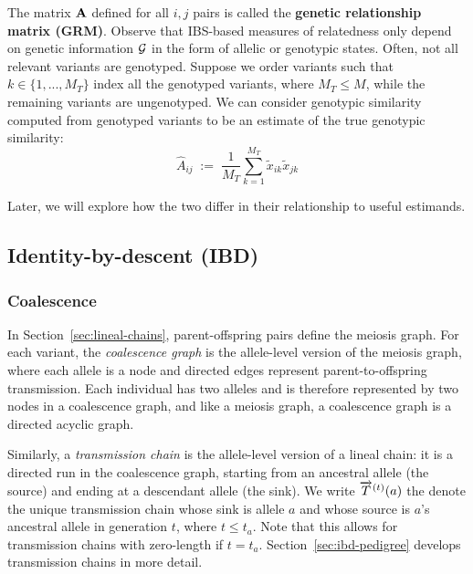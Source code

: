 \documentclass[12pt]{article}
\numberwithin{equation}{section}
\begin{document}
The matrix $\mathbf{A}$ defined for all $i,j$ pairs is called the \textbf{genetic relationship matrix (GRM)}.
Observe that IBS-based measures of relatedness only depend on genetic information $\mathcal{G}$ in the form of allelic or genotypic states.
Often, not all relevant variants are genotyped.
Suppose we order variants such that $k \in \{1 , ... , M_T\}$ index all the genotyped variants, where $M_T \leq M$, while the remaining variants are ungenotyped.
We can consider genotypic similarity computed from genotyped variants to be an estimate of the true genotypic similarity:
\begin{equation}\label{eq:grm-hat}
    \widehat{A}_{ij} \;:=\; \frac{1}{M_T} \sum_{k=1}^{M_T} \tilde{x}_{ik} \tilde{x}_{jk}
\end{equation}

Later, we will explore how the two differ in their relationship to useful estimands.

\subsection{Identity-by-descent (IBD)}\label{sec:ibd}

\subsubsection{Coalescence}\label{sec:coalescence}

In Section~\ref{sec:lineal-chains}, parent-offspring pairs define the meiosis graph.
For each variant, the \emph{coalescence graph} is the allele-level version of the meiosis graph, where each allele is a node and directed edges represent parent-to-offspring transmission.
Each individual has two alleles and is therefore represented by two nodes in a coalescence graph, and like a meiosis graph, a coalescence graph is a directed acyclic graph.

Similarly, a \emph{transmission chain} is the allele-level version of a lineal chain: it is a directed run in the coalescence graph, starting from an ancestral allele (the source) and ending at a descendant allele (the sink).
We write $\overrightarrow{T}^{(t)}(a)$ the denote the unique transmission chain whose sink is allele $a$ and whose source is $a$'s ancestral allele in generation $t$, where $t \leq t_a$.
Note that this allows for transmission chains with zero-length if $t = t_a$.
Section~\ref{sec:ibd-pedigree} develops transmission chains in more detail.
\end{document}
